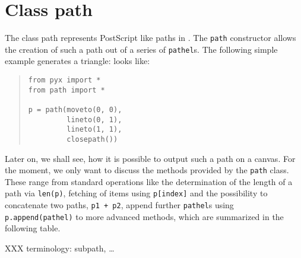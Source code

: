 \section{Class path}

The class path represents PostScript like paths in \PyX. The \verb|path| 
constructor allows the creation of such a path out of a series of 
\verb|pathel|s. The following simple example generates a triangle:
looks like:
\begin{quote}
\begin{verbatim}
from pyx import *
from path import *

p = path(moveto(0, 0), 
         lineto(0, 1),
         lineto(1, 1),
         closepath())
\end{verbatim}
\end{quote}
Later on, we shall see, how it is possible to output such a path on a
canvas. For the moment, we only want to discuss the methods provided
by the \verb|path| class. These range from standard operations like the
determination of the length of a path via \verb|len(p)|, fetching of
items using \verb|p[index]| and the possibility to concatenate two
paths, \verb|p1 + p2|, append further \verb|pathel|s using
\verb|p.append(pathel)| to more advanced methods, which are summarized
in the following table.

XXX terminology: subpath, \dots

